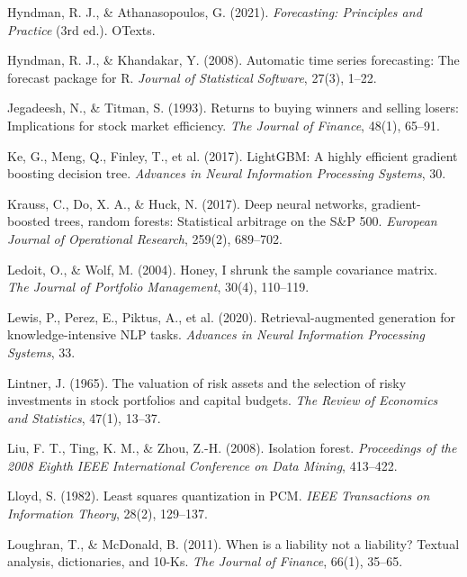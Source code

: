 \documentclass[12pt, a4paper, oneside]{report}
\begin{document}
\begin{enumerate}[label={[\arabic*]}, nosep, leftmargin=*, itemsep=4pt]
\item Hyndman, R. J., \& Athanasopoulos, G. (2021). \textit{Forecasting: Principles and Practice} (3rd ed.). OTexts.

\item Hyndman, R. J., \& Khandakar, Y. (2008). Automatic time series forecasting: The forecast package for R. \textit{Journal of Statistical Software}, 27(3), 1--22.

\item Jegadeesh, N., \& Titman, S. (1993). Returns to buying winners and selling losers: Implications for stock market efficiency. \textit{The Journal of Finance}, 48(1), 65--91.

\item Ke, G., Meng, Q., Finley, T., et al. (2017). LightGBM: A highly efficient gradient boosting decision tree. \textit{Advances in Neural Information Processing Systems}, 30.

\item Krauss, C., Do, X. A., \& Huck, N. (2017). Deep neural networks, gradient-boosted trees, random forests: Statistical arbitrage on the S\&P 500. \textit{European Journal of Operational Research}, 259(2), 689--702.

\item Ledoit, O., \& Wolf, M. (2004). Honey, I shrunk the sample covariance matrix. \textit{The Journal of Portfolio Management}, 30(4), 110--119.

\item Lewis, P., Perez, E., Piktus, A., et al. (2020). Retrieval-augmented generation for knowledge-intensive NLP tasks. \textit{Advances in Neural Information Processing Systems}, 33.

\item Lintner, J. (1965). The valuation of risk assets and the selection of risky investments in stock portfolios and capital budgets. \textit{The Review of Economics and Statistics}, 47(1), 13--37.

\item Liu, F. T., Ting, K. M., \& Zhou, Z.-H. (2008). Isolation forest. \textit{Proceedings of the 2008 Eighth IEEE International Conference on Data Mining}, 413--422.

\item Lloyd, S. (1982). Least squares quantization in PCM. \textit{IEEE Transactions on Information Theory}, 28(2), 129--137.

\item Loughran, T., \& McDonald, B. (2011). When is a liability not a liability? Textual analysis, dictionaries, and 10-Ks. \textit{The Journal of Finance}, 66(1), 35--65.


\end{enumerate}
\end{document}
